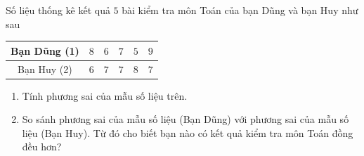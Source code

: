 \begin{bt}%
	Số liệu thống kê kết quả $5$ bài kiểm tra môn Toán của bạn Dũng và bạn Huy như sau
	\begin{center}
		\begin{tabular}{|c|c|c|c|c|c|}
			\hline
			Bạn Dũng (1) & $8$ & $6$ & $7$ & $5$ & $9$  \\
			\hline
			Bạn Huy (2) & $6$ & $7$ & $7$ & $8$ & $7$ \\
			\hline
		\end{tabular}
	\end{center}
	\begin{enumerate}
		\item Tính phương sai của mẫu số liệu trên.
		\item So sánh phương sai của mẫu số liệu (Bạn Dũng) với phương sai của mẫu số liệu (Bạn Huy). Từ đó cho biết bạn nào có kết quả kiểm tra môn Toán đồng đều hơn?
	\end{enumerate}
\end{bt}
